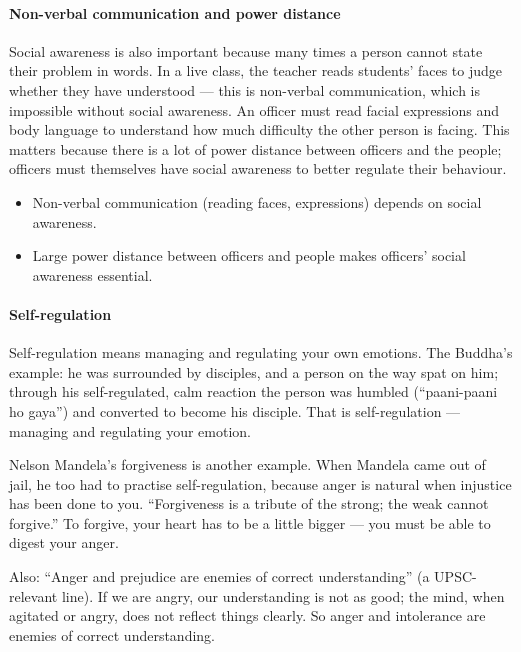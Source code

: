 \paragraph{Non-verbal communication and power distance} Social awareness is also important because many times a person cannot state their problem in words. In a live class, the teacher reads students' faces to judge whether they have understood --- this is non-verbal communication, which is impossible without social awareness. An officer must read facial expressions and body language to understand how much difficulty the other person is facing. This matters because there is a lot of power distance between officers and the people; officers must themselves have social awareness to better regulate their behaviour.

\begin{KeyConcept}
\begin{itemize}
\item Non-verbal communication (reading faces, expressions) depends on social awareness.
\item Large power distance between officers and people makes officers' social awareness essential.
\end{itemize}
\end{KeyConcept}

\paragraph{Self-regulation} Self-regulation means managing and regulating your own emotions. The Buddha's example: he was surrounded by disciples, and a person on the way spat on him; through his self-regulated, calm reaction the person was humbled (``paani-paani ho gaya'') and converted to become his disciple. That is self-regulation --- managing and regulating your emotion.

Nelson Mandela's forgiveness is another example. When Mandela came out of jail, he too had to practise self-regulation, because anger is natural when injustice has been done to you. ``Forgiveness is a tribute of the strong; the weak cannot forgive.'' To forgive, your heart has to be a little bigger --- you must be able to digest your anger.

Also: ``Anger and prejudice are enemies of correct understanding'' (a UPSC-relevant line). If we are angry, our understanding is not as good; the mind, when agitated or angry, does not reflect things clearly. So anger and intolerance are enemies of correct understanding.

